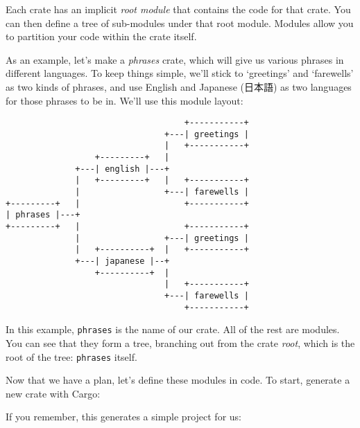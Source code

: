 \documentclass[a4paper,]{book}
\newenvironment{Shaded}{\begin{snugshade}}{\end{snugshade}}
\newcommand{\KeywordTok}[1]{\textcolor[rgb]{0.13,0.29,0.53}{\textbf{{#1}}}}
\newcommand{\NormalTok}[1]{{#1}}
\begin{document}
Each crate has an implicit \emph{root module} that contains the code for
that crate. You can then define a tree of sub-modules under that root
module. Modules allow you to partition your code within the crate
itself.

As an example, let's make a \emph{phrases} crate, which will give us
various phrases in different languages. To keep things simple, we'll
stick to `greetings' and `farewells' as two kinds of phrases, and use
English and Japanese (日本語) as two languages for those phrases to be
in. We'll use this module layout:

\begin{verbatim}
                                    +-----------+
                                +---| greetings |
                                |   +-----------+
                  +---------+   |
              +---| english |---+
              |   +---------+   |   +-----------+
              |                 +---| farewells |
+---------+   |                     +-----------+
| phrases |---+
+---------+   |                     +-----------+
              |                 +---| greetings |
              |   +----------+  |   +-----------+
              +---| japanese |--+
                  +----------+  |
                                |   +-----------+
                                +---| farewells |
                                    +-----------+
\end{verbatim}

In this example, \texttt{phrases} is the name of our crate. All of the
rest are modules. You can see that they form a tree, branching out from
the crate \emph{root}, which is the root of the tree: \texttt{phrases}
itself.

Now that we have a plan, let's define these modules in code. To start,
generate a new crate with Cargo:

\begin{Shaded}
\end{Shaded}

If you remember, this generates a simple project for us:

\begin{Shaded}
\end{Shaded}
\end{document}
